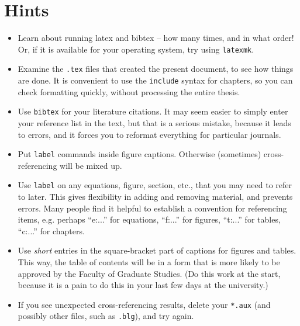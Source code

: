 \chapter{\label{a:hints}Hints}

\begin{itemize}

    \item Learn about running latex and bibtex -- how many times, and in what
        order!  Or, if it is available for your operating system, try using
        \texttt{latexmk}.

    \item Examine the \texttt{.tex} files that created the present document, to
        see how things are done.  It is convenient to use the \texttt{include}
        syntax for chapters, so you can check formatting quickly, without
        processing the entire thesis.

    \item Use \texttt{bibtex} for your literature citations.  It may seem
        easier to simply enter your reference list in the text, but that is a
        serious mistake, because it leads to errors, and it forces you to
        reformat everything for particular journals.

    \item Put \texttt{label} commands inside figure captions.  Otherwise
        (sometimes) cross-referencing will be mixed up.

    \item Use \texttt{label} on any equations, figure, section, etc., that you
        may need to refer to later.  This gives flexibility in adding and
        removing material, and prevents errors.  Many people find it helpful to
        establish a convention for referencing items, e.g. perhaps ``e:...''
        for equations, ``f:...'' for figures, ``t:...'' for tables, ``c:...''
        for chapters.

    \item Use \emph{short} entries in the square-bracket part of captions for
        figures and tables.  This way, the table of contents will be in a form
        that is more likely to be approved by the Faculty of Graduate Studies.
        (Do this work at the start, because it is a pain to do this in your
        last few days at the university.)

    \item If you see unexpected cross-referencing results, delete your
        \texttt{*.aux} (and possibly other files, such as \texttt{.blg}), and
        try again.


\end{itemize}
